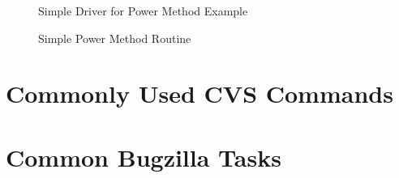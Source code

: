 \documentclass[12pt,relax]{EpetraUserGuide}
\begin{document}
%
\begin{figure}
\begin{center}

\end{center}
\label{Figure:FirstExample}
\caption{Simple Driver for Power Method Example}
\end{figure}

\begin{figure}
\begin{center}

\end{center}
\label{Figure:FirstExamplePowerMethod}
\caption{Simple Power Method Routine}
\end{figure}


\clearpage



\appendix
\section{Commonly Used CVS Commands}
\label{Section:CVS}
\section{Common Bugzilla Tasks}
\label{Section:Bugzilla}
\end{document}
